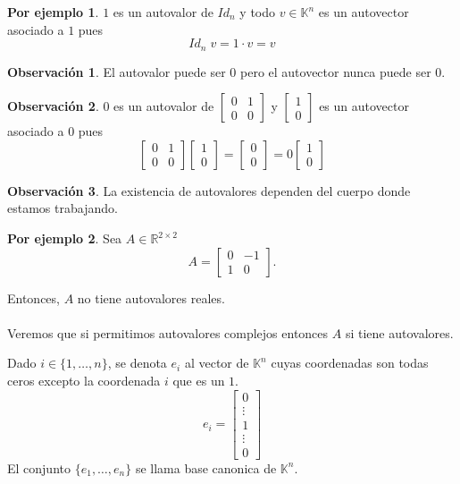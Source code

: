 \documentclass{article}
\theoremstyle{definition}
\theoremstyle{definition}
\newtheorem*{obs}{Observación}
\newtheorem*{ej}{Por ejemplo}
\theoremstyle{remark}
\begin{document}
\begin{ej}
  $1$ es un autovalor de $Id_n$ y todo $v \in \mathbb{K}^n$ es un autovector asociado a $1$ pues \[
Id_n \; v=1 \cdot v = v
  \]
\end{ej}

\begin{obs}
  El autovalor puede ser $0$ pero el autovector nunca puede ser $0$.
\end{obs}
\begin{obs}
  $0$ es un autovalor de $\begin{bmatrix} 0 & 1 \\ 0 & 0\end{bmatrix}$ y $\begin{bmatrix} 1 \\ 0 \end{bmatrix}$ es un autovector asociado a $0$ pues \[
  \begin{bmatrix} 0 & 1 \\ 0 & 0 \end{bmatrix} \begin{bmatrix}1 \\ 0 \end{bmatrix}=\begin{bmatrix}0 \\ 0 \end{bmatrix} = 0 \begin{bmatrix}1 \\ 0 \end{bmatrix}
\]
\end{obs}
\begin{obs}
  La existencia de autovalores dependen del cuerpo donde estamos trabajando.
\end{obs}
\begin{ej}
 Sea $A \in \mathbb{R}^{2 \times 2}$ \[
   A=\begin{bmatrix} 0 & -1 \\ 1 & 0 \end{bmatrix}.
 \]
\end{ej}
Entonces, $A$ no tiene autovalores reales.
\\\\
Veremos que si permitimos autovalores complejos entonces $A$ si tiene autovalores.
\begin{defi}
  Dado $i \in \{1, \dots , n\}$, se denota $e_i$ al vector de $\mathbb{K}^n$ cuyas coordenadas son todas ceros excepto la coordenada $i$ que es un $1$.\[
    e_i=\begin{bmatrix} 0 \\ \vdots \\ 1 \\ \vdots \\ 0 \end{bmatrix}
  \]
  El conjunto $\{e_1, \dots ,e_n\}$ se llama base canonica de $\mathbb{K}^n$.
\end{defi}
\end{document}
